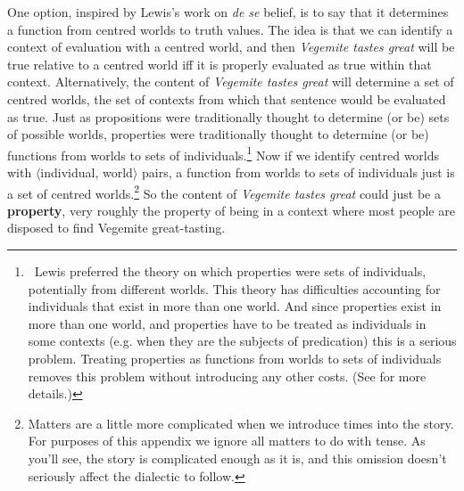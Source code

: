 One option, inspired by Lewis's work on \textit{de se} belief, is to say that it determines a function from centred worlds to truth values. The idea is that we can identify a context of evaluation with a centred world, and then \textit{Vegemite tastes great} will be true relative to a centred world iff it is properly evaluated as true within that context. Alternatively, the content of \textit{Vegemite tastes great} will determine a set of centred worlds, the set of contexts from which that sentence would be evaluated as true. Just as propositions were traditionally thought to determine (or be) sets of possible worlds, properties were traditionally thought to determine (or be) functions from worlds to sets of individuals.\footnote{\ Lewis preferred the theory on which properties were sets of individuals, potentially from different worlds. This theory has difficulties accounting for individuals that exist in more than one world. And since properties exist in more than one world, and properties have to be treated as individuals in some contexts (e.g. when they are the subjects of predication) this is a serious problem. Treating properties as functions from worlds to sets of individuals removes this problem without introducing any other costs. (See \citet{Egan2004-JACSPA-2} for more details.)} Now if we identify centred worlds with {$\langle$}individual, world{$\rangle$} pairs, a function from worlds to sets of individuals just is a set of centred worlds.\footnote{Matters are a little more complicated when we introduce times into the story. For purposes of this appendix we ignore all matters to do with tense. As you'll see, the story is complicated enough as it is, and this omission doesn't seriously affect the dialectic to follow.} So the content of \textit{Vegemite tastes great} could just be a \textbf{property}, very roughly the property of being in a context where most people are disposed to find Vegemite great-tasting.
 
